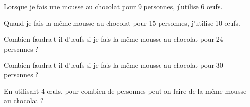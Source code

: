 Lorsque je fais une mousse au chocolat pour 9 personnes, j'utilise 6
\oe ufs.\par Quand je fais la même mousse au chocolat pour 15
personnes, j'utilise 10 \oe ufs.
\begin{myenumerate}
\item Combien faudra-t-il d'\oe ufs si je fais la même mousse au
chocolat pour 24 personnes ?
\item Combien faudra-t-il d'\oe ufs si je fais la même mousse au
chocolat pour 30 personnes ?
\item En utilisant 4 \oe ufs, pour combien de personnes peut-on faire
de la même mousse au chocolat ?
\end{myenumerate}